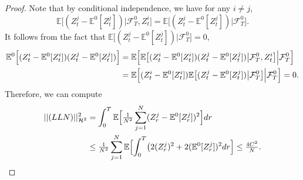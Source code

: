 \documentclass[10pt,a4paper]{article}
\theoremstyle{plain}
\theoremstyle{definition}
\numberwithin{equation}{section}
\begin{document}
\begin{proof}
    
Note that by conditional independence, we have for any  $i \neq j$,
$$
\mathbb{E}\bigl[(Z_{t}^{j}-\mathbb{E}^{0}[Z_{t}^{j}])\big|\mathcal{F}_{T}^{0},Z_{t}^{i}\bigr]= \mathbb{E}\bigl[(Z_{t}^{j}-\mathbb{E}^{0}[Z_{t}^{j}])\big|\mathcal{F}_{T}^{0}\bigr].
$$
It follows from the fact that $\mathbb{E}\bigl[(Z_{t}^{j}-\mathbb{E}^{0}[Z_{t}^{j}])\big|\mathcal{F}_{T}^{0}\bigr] = 0$,
\begin{align}
\mathbb{E}^{0}\Bigl[(Z_{t}^{i}-\mathbb{E}^{0}[Z_{t}^{i}])(Z_{t}^{j}-\mathbb{E}^{0}[Z_{t}^{j}])\Bigr] &= \mathbb{E}\Bigl[\mathbb{E}\bigl[(Z_{t}^{i}-\mathbb{E}^{0}[Z_{t}^{i}])(Z_{t}^{j}-\mathbb{E}^{0}[Z_{t}^{j}])\big|\mathcal{F}_{T}^{0},Z_{t}^{i}\bigr]\Big|\mathcal{F}_{T}^{0}\Bigr] \nonumber \\
&= \mathbb{E}\Bigl[(Z_{t}^{i}-\mathbb{E}^{0}[Z_{t}^{i}])\mathbb{E}\bigl[(Z_{t}^{j}-\mathbb{E}^{0}[Z_{t}^{j}])\big|\mathcal{F}_{T}^{0}\bigr]\Big|\mathcal{F}_{T}^{0}\Bigr] 
= 0. \label{equ:crossvanish}
\end{align}
Therefore, we can compute
\begin{align*}
||(LLN)||_{\mathcal{H}^{2}}^{2} 
&= \int_{0}^{T}\mathbb{E}\Bigl[\tfrac{1}{N^{2}}\sum_{j=1}^{N}(Z_{r}^{j}-\mathbb{E}^{0}[Z_{r}^{j}])^{2}\Bigr]dr \\
&\leq \tfrac{1}{N^{2}}\sum_{j=1}^{N}\mathbb{E}\Bigl[\int_{0}^{T}\bigl(2(Z_{r}^{j})^{2}+2(\mathbb{E}^{0}[Z_{r}^{j}])^{2}dr\Bigr] 
\leq \tfrac{4C^{2}}{N}.
\end{align*}

\end{proof}
\end{document}
